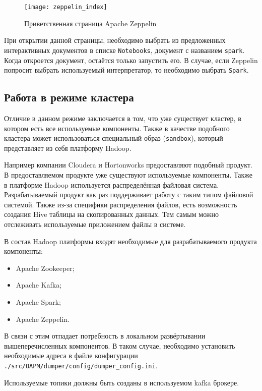 \begin{figure}
    \centering
    \texttt{[image: zeppelin\_index]}
    \caption{Приветственная страница Apache Zeppelin}
    \label{pic:lit_manual:zeppelin_index}
\end{figure}

При открытии данной страницы, необходимо выбрать из предложенных интерактивных документов в списке \texttt{Notebooks}, документ с названием \texttt{spark}.
Когда откроется документ, остаётся только запустить его.
В случае, если Zeppelin попросит выбрать используемый интерпретатор, то необходимо выбрать \texttt{Spark}.

\subsection{Работа в режиме кластера}

Отличие в данном режиме заключается в том, что уже существует кластер, в котором есть все используемые компоненты.
Также в качестве подобного кластера может использоваться специальный образ (\texttt{sandbox}), который представляет из себя платформу Hadoop.

Например компании Cloudera и Hortonworks предоставляют подобный продукт.
В предоставляемом продукте уже существуют используемые компоненты.
Также в платформе Hadoop используется распределённая файловая система.
Разрабатываемый продукт как раз поддерживает работу с таким типом файловой системой.
Также из-за специфики распределения файлов, есть возможность создания Hive таблицы на скопированных данных.
Тем самым можно отслеживать используемые приложением файлы в системе.

В состав Hadoop платформы входят необходимые для разрабатываемого продукта компоненты:
\begin{itemize}
    \item Apache Zookeeper;
    \item Apache Kafka;
    \item Apache Spark;
    \item Apache Zeppelin.
\end{itemize}

В связи с этим отпадает потребность в локальном развёртывании вышеперечисленных компонентов.
В таком случае, необходимо установить необходимые адреса в файле конфигурации \texttt{./src/OAPM/dumper/config/dumper\_config.ini}.

Используемые топики должны быть созданы в используемом kafka брокере.

